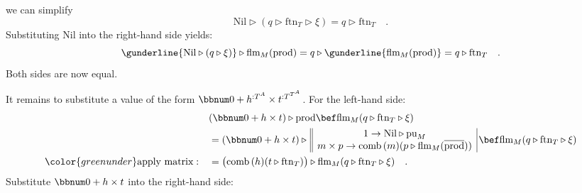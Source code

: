 we can simplify
\[
\text{Nil}\triangleright(q\triangleright\text{ftn}_{T}\triangleright\xi)=q\triangleright\text{ftn}_{T}\quad.
\]
Substituting $\text{Nil}$ into the right-hand side yields:
\[
\gunderline{\text{Nil}\triangleright(q\triangleright\xi)}\triangleright\text{flm}_{M}(\text{prod})=q\triangleright\gunderline{\text{flm}_{M}(\text{prod})}=q\triangleright\text{ftn}_{T}\quad.
\]
Both sides are now equal.

It remains to substitute a value of the form $\bbnum 0+h^{:T^{A}}\times t^{:T^{T^{A}}}$.
For the left-hand side:
\begin{align*}
 & (\bbnum 0+h\times t)\triangleright\text{prod}\bef\text{flm}_{M}(q\triangleright\text{ftn}_{T}\triangleright\xi)\\
 & =(\bbnum 0+h\times t)\triangleright\,\begin{array}{||c|}
1\rightarrow\text{Nil}\triangleright\text{pu}_{M}\\
m\times p\rightarrow\text{comb}\,(m)(p\triangleright\text{flm}_{M}(\overline{\text{prod}}))
\end{array}\,\bef\text{flm}_{M}(q\triangleright\text{ftn}_{T}\triangleright\xi)\\
{\color{greenunder}\text{apply matrix}:}\quad & =\big(\text{comb}\,(h)(t\triangleright\text{ftn}_{T})\big)\triangleright\text{flm}_{M}(q\triangleright\text{ftn}_{T}\triangleright\xi)\quad.
\end{align*}
Substitute $\bbnum 0+h\times t$ into the right-hand side:
